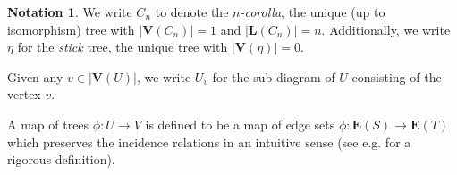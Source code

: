 \documentclass[a4paper,10pt
,draft
]{article}%
\numberwithin{equation}{section}
\numberwithin{figure}{section}
\theoremstyle{definition} %
\newtheorem{notation}[equation]{Notation}%
\newcommand{\set}[1]{\left\{#1\right\}}%
\newcommand{\1}{\ensuremath{\mathbbm 1}}%
\begin{document}
\begin{notation}
      We write $C_n$ to denote the \textit{$n$-corolla}, the unique (up to isomorphism) tree with
      $|\boldsymbol{V}(C_n)| = 1$ and $|\boldsymbol{L}(C_n)|=n$.
      Additionally, we write $\eta$ for the \textit{stick} tree, the unique tree with $|\boldsymbol{V}(\eta)| = 0$.

      Given any $v \in |\boldsymbol{V}(U)|$, we write $U_v$ for the sub-diagram of $U$ consisting of the vertex $v$.
\end{notation}


A map of trees $\phi \colon U \to V$ is defined to be
a map of edge sets $\phi \colon \boldsymbol{E}(S) \to \boldsymbol{E}(T)$
which preserves the incidence relations in an intuitive sense
(see e.g. \cite[\S 2.1]{BP_edss} for a rigorous definition).
\end{document}
